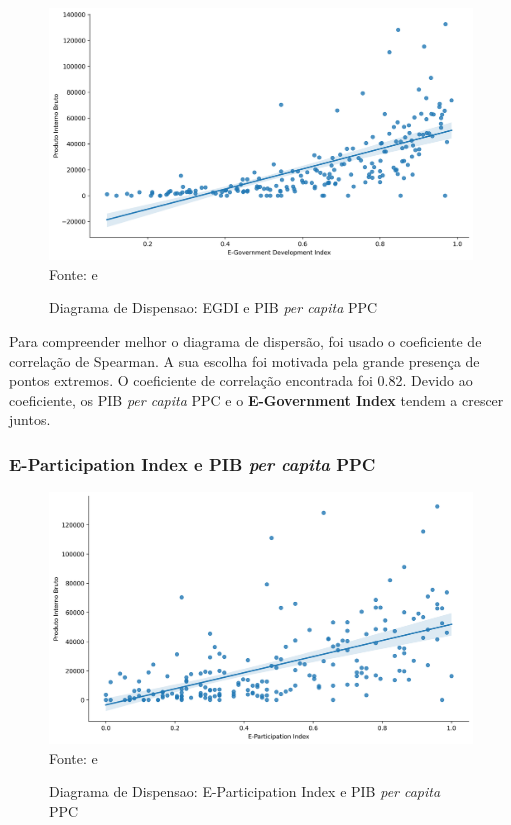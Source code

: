 \begin{figure}[H]
	\centering
	\caption{Diagrama de Dispensao: EGDI e PIB \textit{per capita} PPC}
	\includegraphics[width=1\linewidth]{figuras/egdi/dispensao_egov_pib}
	\label{fig:dispensao_egov_pib}
	\footnotesize{Fonte: \cite{ONU_EGDI} e \cite{WB_pib_per_capita_países}}
\end{figure}

Para compreender melhor o diagrama de dispersão, foi usado o coeficiente de correlação de Spearman. A sua escolha foi motivada pela grande presença de pontos extremos. O coeficiente de correlação encontrada foi 0.82. Devido ao coeficiente, os PIB \textit{per capita} PPC e o \textbf{E-Government Index} tendem a crescer juntos.

\subsubsection{E-Participation Index e PIB \textit{per capita} PPC}

\begin{figure}[H]
	\centering
	\caption{Diagrama de Dispensao: E-Participation Index e PIB \textit{per capita} PPC}
	\includegraphics[width=1\linewidth]{figuras/egdi/dispensao_epart_pib}
	\label{fig:dispensao_epart_pib}
	\footnotesize{Fonte: \cite{ONU_EGDI_mapa} e \cite{WB_pib_per_capita_países}}
\end{figure}

